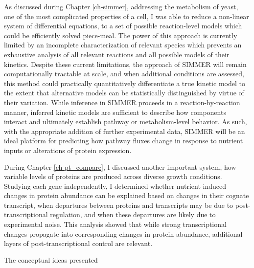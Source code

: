 As discussed during Chapter \ref{ch-simmer}, addressing the metabolism of yeast, one of the most complicated properties of a cell, I was able to reduce a non-linear system of differential equations, to a set of possible reaction-level models which could be efficiently solved piece-meal. The power of this approach is currently limited by an incomplete characterization of relevant species which prevents an exhaustive analysis of all relevant reactions and all possible models of their kinetics. Despite these current limitations, the approach of SIMMER will remain computationally tractable at scale, and when additional conditions are assessed, this method could practically quantitatively differentiate a true kinetic model to the extent that alternative models can be statistically distinguished by virtue of their variation. While inference in SIMMER proceeds in a reaction-by-reaction manner, inferred kinetic models are sufficient to describe how components interact and ultimately establish pathway or metabolism-level behavior. As such, with the appropriate addition of further experimental data, SIMMER will be an ideal platform for predicting how pathway fluxes change in response to nutrient inputs or alterations of protein expression.

During Chapter \ref{ch-pt_compare}, I discussed another important system, how variable levels of proteins are produced across diverse growth conditions. Studying each gene independently, I determined whether nutrient induced changes in protein abundance can be explained based on changes in their cognate transcript, when departures between proteins and transcripts may be due to post-transcriptional regulation, and when these departures are likely due to experimental noise. This analysis showed that while strong transcriptional changes propagate into corresponding changes in protein abundance, additional layers of post-transcriptional control are relevant.

The conceptual ideas presented 